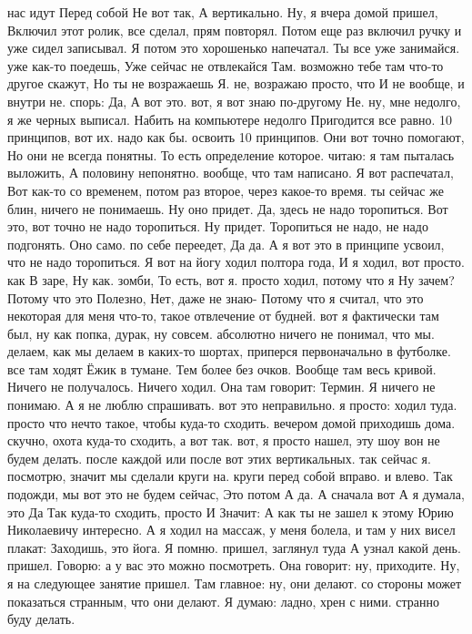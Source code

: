 нас идут Перед собой Не вот так, А вертикально. Ну, я вчера домой пришел, Включил этот ролик, все сделал, прям повторял. Потом еще раз включил ручку и уже сидел записывал. Я потом это хорошенько напечатал.
Ты все уже занимайся.
уже как-то поедешь, Уже сейчас не отвлекайся Там. возможно тебе там что-то другое скажут, Но ты не возражаешь Я.
не, возражаю просто, что И не вообще, и внутри не.
спорь: Да, А вот это. вот, я вот знаю по-другому Не.
ну, мне недолго, я же черных выписал.
Набить на компьютере недолго Пригодится все равно.
10 принципов, вот их.
надо как бы.
освоить 10 принципов. Они вот точно помогают, Но они не всегда понятны. То есть определение которое.
читаю: я там пыталась выложить, А половину непонятно.
вообще, что там написано.
Я вот распечатал, Вот как-то со временем, потом раз второе, через какое-то время. ты сейчас же блин, ничего не понимаешь.
Ну оно придет.
Да, здесь не надо торопиться.
Вот это, вот точно не надо торопиться.
Ну придет.
Торопиться не надо, не надо подгонять.
Оно само.
по себе переедет, Да да.
А я вот это в принципе усвоил, что не надо торопиться. Я вот на йогу ходил полтора года, И я
ходил, вот просто.
как В заре, Ну как.
зомби, То есть, вот я.
просто ходил, потому что я Ну зачем? Потому что это Полезно, Нет, даже не знаю- Потому что я считал, что это некоторая для меня что-то, такое отвлечение от будней. вот я фактически там был, ну как попка, дурак, ну совсем.
абсолютно ничего не понимал, что мы.
делаем, как мы делаем в каких-то шортах, приперся первоначально в футболке. все там ходят Ёжик в тумане.
Тем более без очков.
Вообще там весь кривой.
Ничего не получалось.
Ничего ходил.
Она там говорит:
Термин.
Я ничего не понимаю.
А я не люблю спрашивать.
вот это неправильно. я просто:
ходил туда. просто что нечто такое, чтобы куда-то сходить. вечером домой приходишь дома.
скучно, охота куда-то сходить, а вот так.
вот, я просто нашел, эту шоу вон не будем делать.
после каждой или после вот этих вертикальных.
так сейчас я.
посмотрю, значит мы сделали круги на.
круги перед собой вправо.
и влево. Так подожди, мы вот это не будем сейчас, Это потом А да.
А сначала вот А я думала, это Да Так куда-то сходить, просто И Значит: А как ты не зашел к этому Юрию Николаевичу интересно.
А я ходил на массаж, у меня болела, и там у них висел плакат: Заходишь, это йога. Я помню.
пришел, заглянул туда А узнал какой день.
пришел.
Говорю: а у вас это можно посмотреть.
Она говорит: ну, приходите.
Ну, я на следующее занятие пришел.
Там главное: ну, они делают. со стороны может показаться странным, что они делают.
Я думаю: ладно, хрен с ними. странно буду делать.
